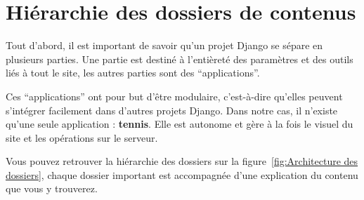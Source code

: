 \chapter{Hiérarchie des dossiers de contenus}

Tout d'abord, il est important de savoir qu'un projet Django se sépare en
plusieurs parties. Une partie est destiné à l'entièreté des paramètres et
des outils liés à tout le site, les autres parties sont des
\enquote{applications}. \newline

Ces \enquote{applications} ont pour but d'être modulaire, c'est-à-dire qu'elles
peuvent s'intégrer facilement dans d'autres projets Django. Dans notre cas,
il n'existe qu'une seule application : \textbf{tennis}. Elle est autonome et
gère à la fois le visuel du site et les opérations sur le serveur. \newline

Vous pouvez retrouver la hiérarchie des dossiers sur la
figure~\ref{fig:Architecture des dossiers}, chaque dossier important est
accompagnée d'une explication du contenu que vous y trouverez.

